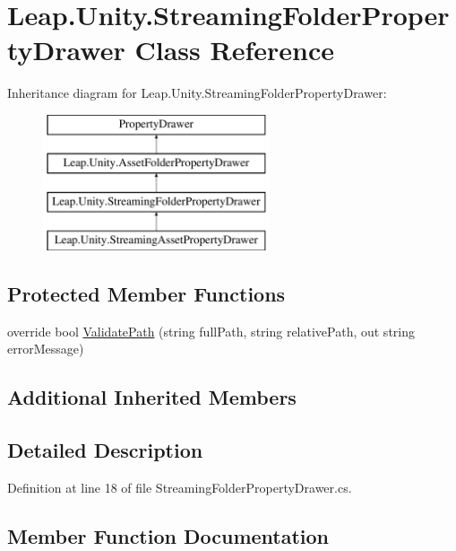 \hypertarget{class_leap_1_1_unity_1_1_streaming_folder_property_drawer}{}\section{Leap.\+Unity.\+Streaming\+Folder\+Property\+Drawer Class Reference}
\label{class_leap_1_1_unity_1_1_streaming_folder_property_drawer}
Inheritance diagram for Leap.\+Unity.\+Streaming\+Folder\+Property\+Drawer\+:\begin{figure}[H]
\begin{center}
\leavevmode
\includegraphics[height=4.000000cm]{class_leap_1_1_unity_1_1_streaming_folder_property_drawer}
\end{center}
\end{figure}
\subsection*{Protected Member Functions}
\begin{DoxyCompactItemize}
\item 
override bool \mbox{\hyperlink{class_leap_1_1_unity_1_1_streaming_folder_property_drawer_a089e68d00c4882ff5f1d71a4f05a4d99}{Validate\+Path}} (string full\+Path, string relative\+Path, out string error\+Message)
\end{DoxyCompactItemize}
\subsection*{Additional Inherited Members}


\subsection{Detailed Description}


Definition at line 18 of file Streaming\+Folder\+Property\+Drawer.\+cs.



\subsection{Member Function Documentation}
\mbox{\label{class_leap_1_1_unity_1_1_streaming_folder_property_drawer_a089e68d00c4882ff5f1d71a4f05a4d99}} 
